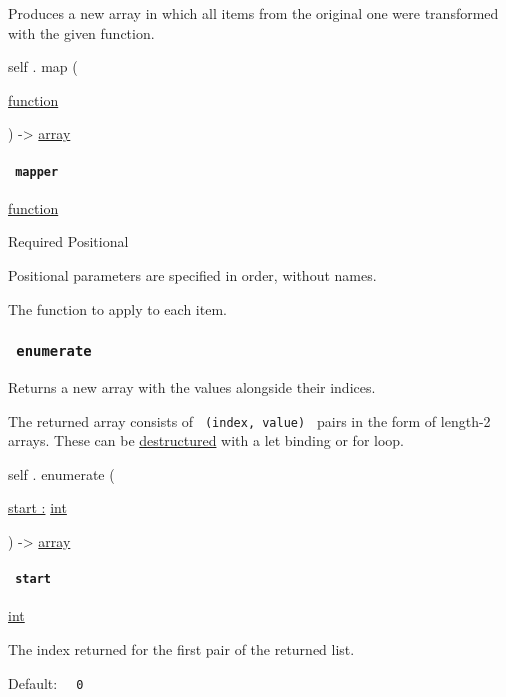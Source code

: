 Produces a new array in which all items from the original one were
transformed with the given function.

self { . } { map } (

{ \href{/docs/reference/foundations/function/}{function} }

) -\textgreater{} \href{/docs/reference/foundations/array/}{array}

\paragraph{\texorpdfstring{\texttt{\ mapper\ }}{ mapper }}\label{definitions-map-mapper}

\href{/docs/reference/foundations/function/}{function}

{Required} {{ Positional }}

\label{definitions-map-mapper-positional-tooltip}
Positional parameters are specified in order, without names.

The function to apply to each item.

\subsubsection{\texorpdfstring{\texttt{\ enumerate\ }}{ enumerate }}\label{definitions-enumerate}

Returns a new array with the values alongside their indices.

The returned array consists of \texttt{\ (index,\ value)\ } pairs in the
form of length-2 arrays. These can be
\href{/docs/reference/scripting/\#bindings}{destructured} with a let
binding or for loop.

self { . } { enumerate } (

{ \hyperref[definitions-enumerate-parameters-start]{start :}
\href{/docs/reference/foundations/int/}{int} }

) -\textgreater{} \href{/docs/reference/foundations/array/}{array}

\paragraph{\texorpdfstring{\texttt{\ start\ }}{ start }}\label{definitions-enumerate-start}

\href{/docs/reference/foundations/int/}{int}

The index returned for the first pair of the returned list.

Default: \texttt{\ }{\texttt{\ 0\ }}\texttt{\ }

